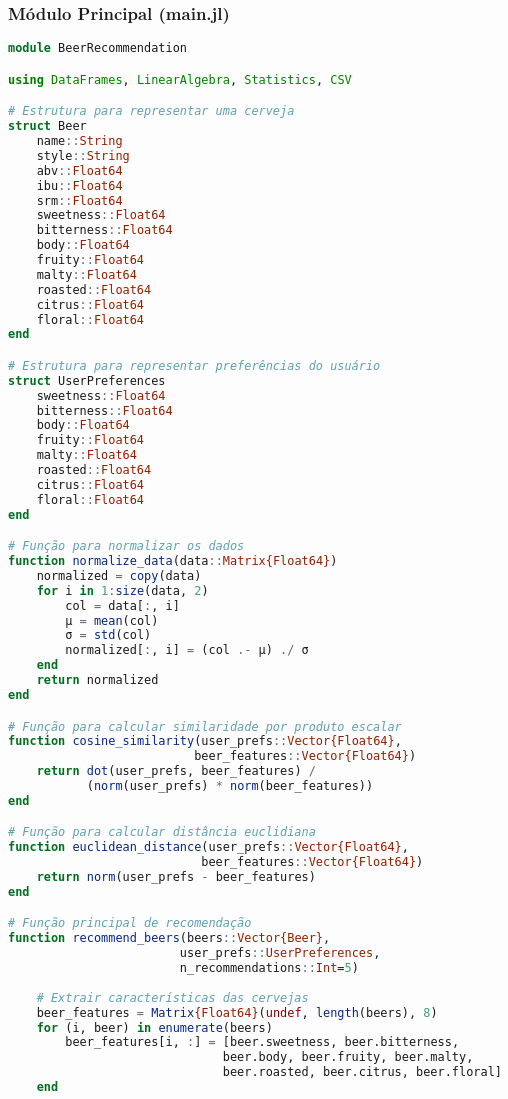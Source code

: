 \documentclass[12pt,a4paper]{article}
\begin{document}
\subsubsection{Módulo Principal (main.jl)}

\begin{lstlisting}[language=Julia, caption=Código principal do sistema de recomendação]
module BeerRecommendation

using DataFrames, LinearAlgebra, Statistics, CSV

# Estrutura para representar uma cerveja
struct Beer
    name::String
    style::String
    abv::Float64
    ibu::Float64
    srm::Float64
    sweetness::Float64
    bitterness::Float64
    body::Float64
    fruity::Float64
    malty::Float64
    roasted::Float64
    citrus::Float64
    floral::Float64
end

# Estrutura para representar preferências do usuário
struct UserPreferences
    sweetness::Float64
    bitterness::Float64
    body::Float64
    fruity::Float64
    malty::Float64
    roasted::Float64
    citrus::Float64
    floral::Float64
end

# Função para normalizar os dados
function normalize_data(data::Matrix{Float64})
    normalized = copy(data)
    for i in 1:size(data, 2)
        col = data[:, i]
        μ = mean(col)
        σ = std(col)
        normalized[:, i] = (col .- μ) ./ σ
    end
    return normalized
end

# Função para calcular similaridade por produto escalar
function cosine_similarity(user_prefs::Vector{Float64}, 
                          beer_features::Vector{Float64})
    return dot(user_prefs, beer_features) / 
           (norm(user_prefs) * norm(beer_features))
end

# Função para calcular distância euclidiana
function euclidean_distance(user_prefs::Vector{Float64}, 
                           beer_features::Vector{Float64})
    return norm(user_prefs - beer_features)
end

# Função principal de recomendação
function recommend_beers(beers::Vector{Beer}, 
                        user_prefs::UserPreferences, 
                        n_recommendations::Int=5)
    
    # Extrair características das cervejas
    beer_features = Matrix{Float64}(undef, length(beers), 8)
    for (i, beer) in enumerate(beers)
        beer_features[i, :] = [beer.sweetness, beer.bitterness, 
                              beer.body, beer.fruity, beer.malty, 
                              beer.roasted, beer.citrus, beer.floral]
    end
    

\end{lstlisting}
\end{document}
